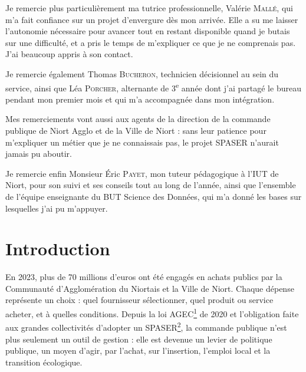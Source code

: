 \documentclass[11pt,a4paper]{article}
\newcommand{\lexref}[1]{\hyperlink{lex:#1}{\textsuperscript{#1}}}
\begin{document}
Je remercie plus particulièrement ma tutrice professionnelle, Valérie \textsc{Mallé}, qui m'a fait confiance sur un projet d'envergure dès mon arrivée. Elle a su me laisser l'autonomie nécessaire pour avancer tout en restant disponible quand je butais sur une difficulté, et a pris le temps de m'expliquer ce que je ne comprenais pas. J'ai beaucoup appris à son contact.

Je remercie également Thomas \textsc{Bucheron}, technicien décisionnel au sein du service, ainsi que Léa \textsc{Porcher}, alternante de 3\textsuperscript{e} année dont j'ai partagé le bureau pendant mon premier mois et qui m'a accompagnée dans mon intégration.

Mes remerciements vont aussi aux agents de la direction de la commande publique de Niort Agglo et de la Ville de Niort : sans leur patience pour m'expliquer un métier que je ne connaissais pas, le projet SPASER n'aurait jamais pu aboutir.

Je remercie enfin Monsieur Éric \textsc{Payet}, mon tuteur pédagogique à l'IUT de Niort, pour son suivi et ses conseils tout au long de l'année, ainsi que l'ensemble de l'équipe enseignante du BUT Science des Données, qui m'a donné les bases sur lesquelles j'ai pu m'appuyer.

\newpage
\section*{Introduction}
En 2023, plus de 70 millions d'euros ont été engagés en achats publics par la Communauté d'Agglomération du Niortais et la Ville de Niort. Chaque dépense représente un choix : quel fournisseur sélectionner, quel produit ou service acheter, et à quelles conditions. Depuis la loi AGEC\lexref{1} de 2020 et l'obligation faite aux grandes collectivités d'adopter un SPASER\lexref{2}, la commande publique n'est plus seulement un outil de gestion : elle est devenue un levier de politique publique, un moyen d'agir, par l'achat, sur l'insertion, l'emploi local et la transition écologique.
\end{document}
